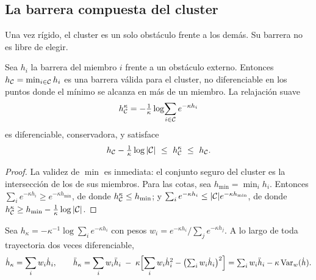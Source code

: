 \subsection{La barrera compuesta del cluster}

Una vez rígido, el cluster es un solo obstáculo frente a los demás. Su barrera
no es libre de elegir.

\begin{proposicion}
\label{pr:barrera-compuesta}
Sea $h_i$ la barrera del miembro $i$ frente a un obstáculo externo. Entonces
$h_{\mathcal{C}}=\min_{i\in\mathcal{C}}h_i$ es una barrera válida para el cluster, no
diferenciable en los puntos donde el mínimo se alcanza en más de un miembro.
La relajación suave
\[
  h_{\mathcal{C}}^{\kappa}=-\tfrac1\kappa\log\!\sum_{i\in\mathcal{C}}e^{-\kappa h_i}
\]
es diferenciable, conservadora, y satisface
\[
  h_\Ccal-\tfrac{1}{\kappa}\log|\Ccal|\ \le\ h_\Ccal^{\kappa}\ \le\ h_\Ccal .
\]
\end{proposicion}

\begin{proof}
La validez de $\min$ es inmediata: el conjunto seguro del cluster es la
intersección de los de sus miembros. Para las cotas, sea $h_{\min}=\min_ih_i$.
Entonces $\sum_ie^{-\kappa h_i}\ge e^{-\kappa h_{\min}}$, de donde
$h_{\mathcal{C}}^{\kappa}\le h_{\min}$; y
$\sum_ie^{-\kappa h_i}\le|\mathcal{C}|e^{-\kappa h_{\min}}$, de donde
$h_{\mathcal{C}}^{\kappa}\ge h_{\min}-\tfrac1\kappa\log|\mathcal{C}|$.
\end{proof}

\begin{proposicion}
\label{pr:softmin-curvatura}
Sea $h_\kappa=-\kappa^{-1}\log\sum_i e^{-\kappa h_i}$ con pesos
$w_i=e^{-\kappa h_i}/\sum_j e^{-\kappa h_j}$. A lo largo de toda trayectoria dos
veces diferenciable,
\[
  \dot h_\kappa=\sum_i w_i\dot h_i,
  \qquad
  \ddot h_\kappa=\sum_i w_i\ddot h_i\;-\;\kappa\Bigl[\sum_i w_i\dot h_i^{2}-\bigl(\textstyle\sum_i w_i\dot h_i\bigr)^{2}\Bigr]
  =\sum_i w_i\ddot h_i-\kappa\,\mathrm{Var}_w(\dot h).
\]
\end{proposicion}

